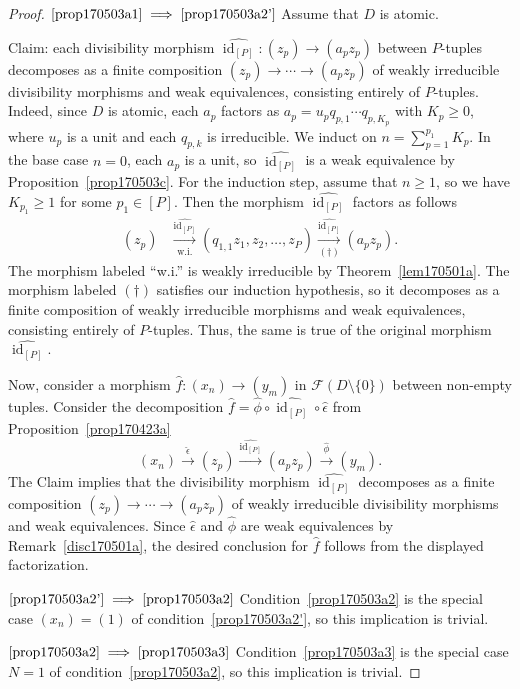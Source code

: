 \documentclass[reqno]{amsart}
\theoremstyle{plain}
\theoremstyle{definition}
\newcommand{\cat}[1]{\mathcal{#1}}
\newcommand{\catf}{\cat{F}}
\newcommand{\id}{\operatorname{id}}
\newcommand{\xra}{\xrightarrow}
\renewcommand{\geq}{\geqslant}
\numberwithin{equation}{lem}
\begin{document}
\begin{proof}
$\eqref{prop170503a1}\implies\eqref{prop170503a2'}$
Assume that $D$ is atomic.

Claim: each divisibility morphism $\widehat{\id_{[P]}}\colon(z_p)\to(a_pz_p)$ between $P$-tuples
decomposes as a finite composition
$(z_p)\to\cdots\to(a_pz_p)$ of 
weakly
irreducible divisibility morphisms and weak equivalences, consisting entirely of $P$-tuples.
Indeed, since $D$ is atomic, each $a_p$ factors as $a_p=u_pq_{p,1}\cdots q_{p,K_p}$ 
with $K_p\geq 0$, where $u_p$ is a unit and
each $q_{p,k}$ is irreducible.
We induct on $n=\sum_{p=1}^{p_1}K_p$.
In the base case $n=0$, each $a_p$ is a unit, so $\widehat{\id_{[P]}}$ is a weak equivalence by Proposition~\ref{prop170503c}.
For the induction step, assume that $n\geq 1$, so we have $K_{p_1}\geq 1$ for some $p_1\in [P]$.
Then the morphism $\widehat{\id_{[P]}}$ factors as follows
\begin{align*}
(z_p)
&\xra[\text{w.i.}]{\widehat{\id_{[P]}}}(q_{1,1}z_1,z_2,\ldots,z_P)
\xra[(\dagger)]{\widehat{\id_{[P]}}}(a_pz_p).
\end{align*}
The  morphism labeled ``w.i.'' is
weakly
irreducible by Theorem~\ref{lem170501a}.
The morphism labeled $(\dagger)$ satisfies our induction hypothesis, so it
decomposes as a finite composition
of 
weakly
irreducible morphisms and weak equivalences, consisting entirely of $P$-tuples.
Thus, the same is true of the original morphism $\widehat{\id_{[P]}}$.

Now,
consider a morphism $\hat f\colon (x_n)\to(y_m)$ in $\catf(D \setminus \{0\})$ between non-empty tuples.
Consider the decomposition $\hat f=\hat\phi\circ\widehat{\id_{[P]}}\circ\hat\epsilon$ from Proposition~\ref{prop170423a}
$$(x_n)\xra{\hat\epsilon}(z_p)\xra{\widehat{\id_{[P]}}}(a_pz_p)
\xra{\hat\phi}(y_m).$$
The Claim implies that the divisibility morphism $\widehat{\id_{[P]}}$
decomposes as a finite composition
$(z_p)\to\cdots\to(a_pz_p)$ of 
weakly
irreducible divisibility morphisms and weak equivalences.
Since $\hat\epsilon$ and $\hat\phi$ are weak equivalences by Remark~\ref{disc170501a}, 
the desired conclusion for $\hat f$ follows from the displayed factorization.


$\eqref{prop170503a2'}\implies\eqref{prop170503a2}$
Condition~\eqref{prop170503a2} is the special case $(x_n)=(1)$ of condition~\eqref{prop170503a2'}, so this implication is trivial.

$\eqref{prop170503a2}\implies\eqref{prop170503a3}$
Condition~\eqref{prop170503a3} is the special case $N=1$ of condition~\eqref{prop170503a2}, so this implication is trivial.


\end{proof}
\end{document}
